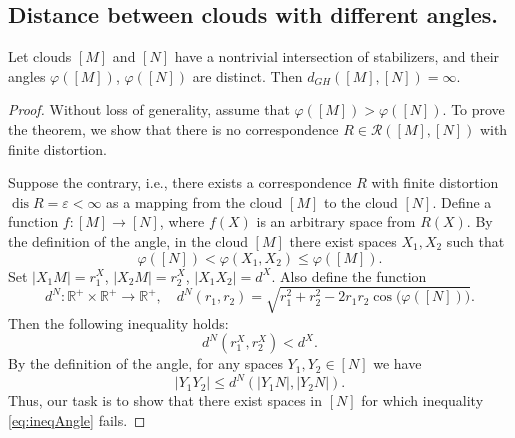 \subsection{Distance between clouds with different angles.}

\begin{theorem}
  \label{thm:diffAngles}
  Let clouds \([M]\) and \([N]\) have a nontrivial intersection of
  stabilizers, and their angles \(\varphi([M])\),
  \(\varphi([N])\) are distinct. Then \(d_{GH}([M],[N]) = \infty\).
\end{theorem}

\begin{proof}
  Without loss of generality, assume that \(\varphi([M]) >
  \varphi([N])\). To prove the theorem, we show that there is no
  correspondence \(R \in \mathcal{R}([M],[N])\) with finite distortion.

  Suppose the contrary, i.e., there exists a correspondence \(R\)
  with finite distortion \(\operatorname{dis} R = \varepsilon <
  \infty\) as a mapping from the cloud \([M]\) to the cloud \([N]\).
  Define a function \(f \colon [M] \to [N]\), where \(f(X)\) is an
  arbitrary space from \(R(X)\). By the definition of the angle, in
  the cloud \([M]\) there exist spaces \(X_1, X_2\) such that
  \[
    \varphi([N]) < \varphi(X_1, X_2) \le \varphi([M]).
  \]
  Set \(|X_1 M| = r_1^X\), \(|X_2 M| = r_2^X\), \(|X_1 X_2| = d^X\).
  Also define the function
  \[
    d^N \colon \mathbb{R}^+ \times \mathbb{R}^+ \to \mathbb{R}^+,
    \quad d^N(r_1, r_2) = \sqrt{r_1^2 + r_2^2 - 2 r_1 r_2
    \cos\bigl(\varphi([N])\bigr)}.
  \]
  Then the following inequality holds:
  \begin{equation}
    d^N(r_1^X, r_2^X) < d^X. \label{eq:ineqdx}
  \end{equation}
  By the definition of the angle, for any spaces \(Y_1, Y_2 \in [N]\) we have
  \begin{equation}
    |Y_1 Y_2| \le d^N(|Y_1 N|, |Y_2 N|). \label{eq:ineqAngle}
  \end{equation}
  Thus, our task is to show that there exist spaces in \([N]\) for
  which inequality \eqref{eq:ineqAngle} fails.


\end{proof}
